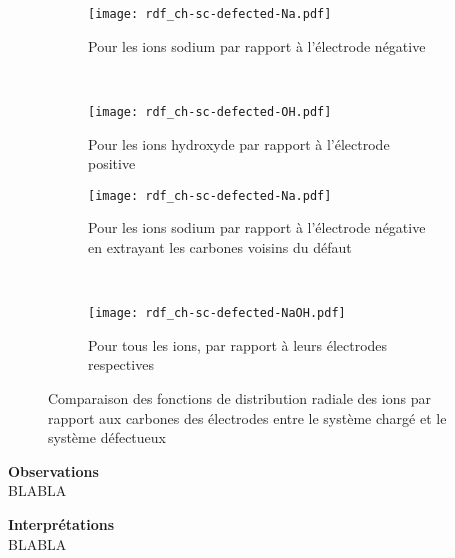 \begin{figure}[h!]
    \centering
    \begin{subfigure}[t]{.49 \textwidth}
        \centering
        \texttt{[image: rdf\_ch-sc-defected-Na.pdf]}
        \caption{Pour les ions sodium par rapport à l'électrode négative}
    \end{subfigure}%
    ~
    \begin{subfigure}[t]{.49 \textwidth}
        \centering
        \texttt{[image: rdf\_ch-sc-defected-OH.pdf]}
        \caption{Pour les ions hydroxyde par rapport à l'électrode positive}
    \end{subfigure}

    \begin{subfigure}[t]{.49 \textwidth}
        \centering
        \texttt{[image: rdf\_ch-sc-defected-Na.pdf]}
        \caption{Pour les ions sodium par rapport à l'électrode négative en extrayant les carbones voisins du défaut}
    \end{subfigure}%
    ~
    \begin{subfigure}[t]{.49 \textwidth}
        \centering
        \texttt{[image: rdf\_ch-sc-defected-NaOH.pdf]}
        \caption{Pour tous les ions, par rapport à leurs électrodes respectives}
    \end{subfigure}
    \caption{Comparaison des fonctions de distribution radiale des ions par rapport aux carbones des électrodes entre le système chargé et le système défectueux}
    \label{fig:rdf_ch-sc-defected}
\end{figure}

\clearpage
\textbf{Observations}\\
BLABLA

\textbf{Interprétations}\\
BLABLA
